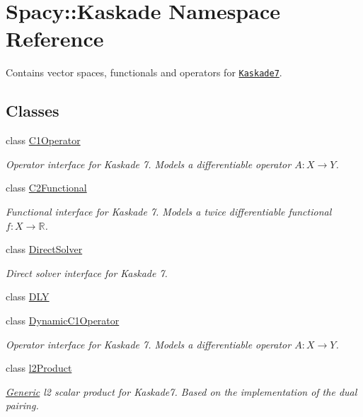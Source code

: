 \hypertarget{namespaceSpacy_1_1Kaskade}{\section{\-Spacy\-:\-:\-Kaskade \-Namespace \-Reference}
\label{namespaceSpacy_1_1Kaskade}
}


\-Contains vector spaces, functionals and operators for \href{http://www.zib.de/projects/kaskade7-finite-element-toolbox}{\tt \-Kaskade7}.  


\subsection*{\-Classes}
\begin{DoxyCompactItemize}
\item 
class \hyperlink{classSpacy_1_1Kaskade_1_1C1Operator}{\-C1\-Operator}
\begin{DoxyCompactList}\small\item\em \-Operator interface for \-Kaskade 7. \-Models a differentiable operator $A:X\rightarrow Y$. \end{DoxyCompactList}\item 
class \hyperlink{classSpacy_1_1Kaskade_1_1C2Functional}{\-C2\-Functional}
\begin{DoxyCompactList}\small\item\em \-Functional interface for \-Kaskade 7. \-Models a twice differentiable functional $f:X\rightarrow \mathbb{R}$. \end{DoxyCompactList}\item 
class \hyperlink{classSpacy_1_1Kaskade_1_1DirectSolver}{\-Direct\-Solver}
\begin{DoxyCompactList}\small\item\em \-Direct solver interface for \-Kaskade 7. \end{DoxyCompactList}\item 
class \hyperlink{classSpacy_1_1Kaskade_1_1DLY}{\-D\-L\-Y}
\item 
class \hyperlink{classSpacy_1_1Kaskade_1_1DynamicC1Operator}{\-Dynamic\-C1\-Operator}
\begin{DoxyCompactList}\small\item\em \-Operator interface for \-Kaskade 7. \-Models a differentiable operator $A:X\rightarrow Y$. \end{DoxyCompactList}\item 
class \hyperlink{classSpacy_1_1Kaskade_1_1l2Product}{l2\-Product}
\begin{DoxyCompactList}\small\item\em \hyperlink{namespaceSpacy_1_1Generic}{\-Generic} l2 scalar product for \-Kaskade7. \-Based on the implementation of the dual pairing. \end{DoxyCompactList}\item 

\end{DoxyCompactItemize}
